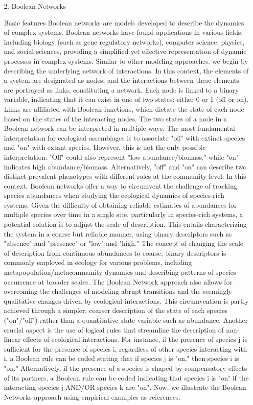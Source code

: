     2. Boolean Networks

Basic features
Boolean networks are models developed to describe the dynamics of complex systems. Boolean networks have found applications in various fields, including biology (such as gene regulatory networks), computer science, physics, and social sciences, providing a simplified yet effective representation of dynamic processes in complex systems. Similar to other modeling approaches, we begin by describing the underlying network of interactions. In this context, the elements of a system are designated as nodes, and the interactions between these elements are portrayed as links, constituting a network. Each node is linked to a binary variable, indicating that it can exist in one of two states: either 0 or 1 (off or on). Links are affiliated with Boolean functions, which dictate the state of each node based on the states of the interacting nodes.
The two states of a node in a Boolean network can be interpreted in multiple ways. The most fundamental interpretation for ecological assemblages is to associate "off" with extinct species and "on" with extant species. However, this is not the only possible interpretation. "Off" could also represent "low abundance/biomass," while "on" indicates high abundance/biomass. Alternatively, "off" and "on" can describe two distinct prevalent phenotypes with different roles at the community level. In this context, Boolean networks offer a way to circumvent the challenge of tracking species abundances when studying the ecological dynamics of species-rich systems. Given the difficulty of obtaining reliable estimates of abundances for multiple species over time in a single site, particularly in species-rich systems, a potential solution is to adjust the scale of description. This entails characterizing the system in a coarse but reliable manner, using binary descriptors such as "absence" and "presence" or "low" and "high." The concept of changing the scale of description from continuous abundances to coarse, binary descriptors is commonly employed in ecology for various problems, including metapopulation/metacommunity dynamics and describing patterns of species occurrence at broader scales.
The Boolean Network approach also allows for overcoming the challenges of modeling abrupt transitions and the seemingly qualitative changes driven by ecological interactions. This circumvention is partly achieved through a simpler, coarser description of the state of each species ("on"/"off") rather than a quantitative state variable such as abundance. Another crucial aspect is the use of logical rules that streamline the description of non-linear effects of ecological interactions. For instance, if the presence of species j is sufficient for the presence of species i, regardless of other species interacting with i, a Boolean rule can be coded stating that if species j is "on," then species i is "on." Alternatively, if the presence of a species is shaped by compensatory effects of its partners, a Boolean rule can be coded indicating that species i is "on" if the interacting species j AND/OR species k are "on". Now, we illustrate the Boolean Networks approach using empirical examples as references.

